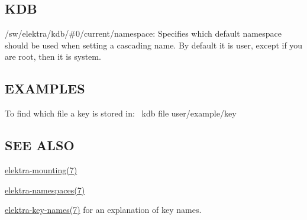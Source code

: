 \subsection*{K\+DB}


\begin{DoxyItemize}
\item {\ttfamily /sw/elektra/kdb/\#0/current/namespace}\+: Specifies which default namespace should be used when setting a cascading name. By default it is {\ttfamily user}, except if you are root, then it is {\ttfamily system}.
\end{DoxyItemize}

\subsection*{E\+X\+A\+M\+P\+L\+ES}

To find which file a key is stored in\+:~\newline
 {\ttfamily kdb file user/example/key}~\newline


\subsection*{S\+EE A\+L\+SO}


\begin{DoxyItemize}
\item \hyperlink{doc_help_elektra-mounting_md}{elektra-\/mounting(7)}
\item \hyperlink{doc_help_elektra-namespaces_md}{elektra-\/namespaces(7)}
\item \hyperlink{doc_help_elektra-key-names_md}{elektra-\/key-\/names(7)} for an explanation of key names. 
\end{DoxyItemize}